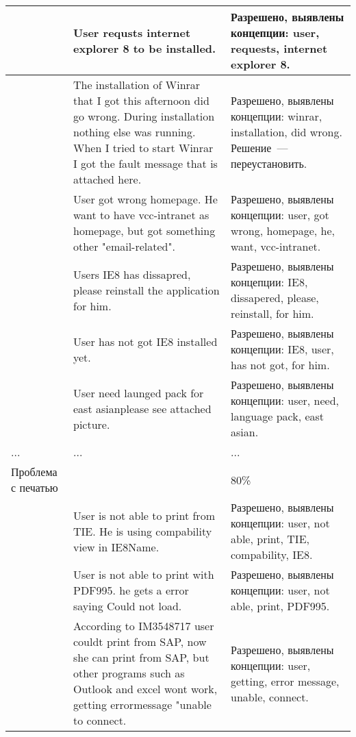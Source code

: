 \begin{longtable}{|p{5cm}|p{6cm}|p{5cm}|}
\hline         &    User requsts internet explorer 8 to be installed.   &  Разрешено, выявлены концепции: user, requests, internet explorer 8.  \\
\hline         &    The installation of Winrar that I got this afternoon did go wrong. During installation nothing else was running. When I tried to start Winrar I got the fault message that is attached here.   &  Разрешено, выявлены концепции: winrar, installation, did wrong. Решение~--- переустановить. \\

\hline         &    User got wrong homepage. He want to have vcc-intranet as homepage, but got something other "email-related".   &  Разрешено, выявлены концепции: user, got wrong, homepage, he, want, vcc-intranet.  

\\

\hline         &    Users IE8 has dissapred, please reinstall the application for him.   &  Разрешено, выявлены концепции: IE8, dissapered, please, reinstall, for him.  

\\

\hline         &    User has not got IE8 installed yet.   &  Разрешено, выявлены концепции: IE8, user, has not got, for him.  

\\

\hline         &    User need launged pack for east asianplease see attached picture.   &  Разрешено, выявлены концепции: user, need, language pack, east asian.  
\\



\hline     ...    &   ...   & ... \\



 \hline Проблема с печатью    &     & 80\% \\
 
 \hline         &    User is not able to print from TIE. He is using compability view in IE8Name.   &  Разрешено, выявлены концепции: user, not able, print, TIE, compability, IE8.  \\
 
  \hline         &    User is not able to print with PDF995. he gets a error saying Could not load.   &  Разрешено, выявлены концепции: user, not able, print, PDF995.  \\
 
 \hline         &    According to IM3548717 user couldt print from SAP, now she can print from SAP, but other programs such as Outlook and excel wont work, getting errormessage "unable to connect.   &  Разрешено, выявлены концепции: user, getting, error message, unable, connect.  \\
 

\end{longtable}

